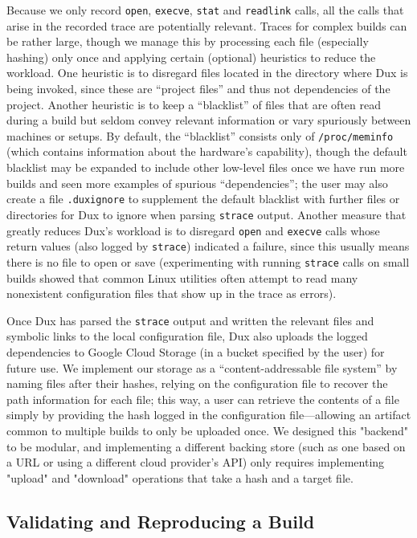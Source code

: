\documentclass[10pt,conference]{IEEEtran}
\begin{document}
Because we only record \texttt{open}, \texttt{execve}, \texttt{stat} and \texttt{readlink} calls, all the
calls that arise in the recorded trace are potentially relevant. Traces for complex builds can be rather
large, though we manage this by processing each file (especially hashing) only once and applying certain
(optional) heuristics to reduce the workload. One heuristic is to disregard files located in the directory 
where Dux is being invoked, since these are ``project files'' and thus not dependencies of the project. 
Another heuristic is to keep a ``blacklist'' of files that are often read during a build but seldom convey 
relevant information or vary spuriously between machines or setups. By default, the ``blacklist'' consists 
only of \texttt{/proc/meminfo} (which contains information about the hardware's capability), though the 
default blacklist may be expanded to include other low-level files once we have run more builds and seen more
 examples of spurious ``dependencies''; the user may also create a file \texttt{.duxignore} to supplement 
the default blacklist with further files or directories for Dux to ignore when parsing \texttt{strace} output.
Another measure that greatly reduces Dux's workload is to disregard \texttt{open} and \texttt{execve} calls
whose return values (also logged by \texttt{strace}) indicated a failure, since this usually means there is no 
file to open or save (experimenting with running \texttt{strace} calls on small builds showed that common 
Linux utilities often attempt to read many nonexistent configuration files that show up in the trace as errors).

Once Dux has parsed the \texttt{strace} output and written the relevant files and symbolic links to
the local configuration file, Dux also uploads the logged dependencies to Google Cloud Storage (in a
bucket specified by the user) for future use. We implement our storage as a ``content-addressable
file system'' by naming files after their hashes, relying on the configuration file to recover
the path information for each file; this way, a user can retrieve the contents of a file simply by 
providing the hash logged in the configuration file---allowing an artifact common to multiple builds to
only be uploaded once. We designed this "backend" to be modular, and implementing a different backing store
(such as one based on a URL or using a different cloud provider's API) only requires implementing
"upload" and "download" operations that take a hash and a target file.

\subsection{Validating and Reproducing a Build}
\end{document}
